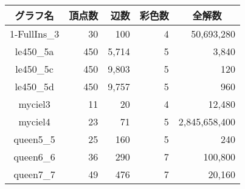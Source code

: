 \begin{tabular}{|c|r|r|r|r|} \hline
  グラフ名 & 頂点数 & 辺数 & 彩色数 & \multicolumn{1}{c|}{全解数} \\ \hline
  1-FullIns\_3 & 30 & 100 & 4 & 50,693,280 \\ \hline
  le450\_5a & 450 & 5,714 & 5 & 3,840 \\ \hline
  le450\_5c & 450 & 9,803 & 5 & 120 \\ \hline
  le450\_5d & 450 & 9,757 & 5 & 960 \\ \hline
  myciel3 & 11 & 20 & 4 & 12,480 \\ \hline
  myciel4 & 23 & 71 & 5 & 2,845,658,400 \\ \hline
  queen5\_5 & 25 & 160 & 5 & 240 \\ \hline 
  queen6\_6 & 36 & 290 & 7 & 100,800 \\ \hline
  queen7\_7 & 49 & 476 & 7 & 20,160 \\ \hline
\end{tabular}